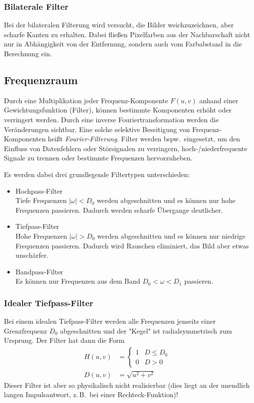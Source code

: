 \documentclass[a4paper, 11pt, accentcolor = tud3b]{tudreport}
\newcommand{\bspw}{bspw.~}
\newcommand{\zB}{z.\,B.~}
\begin{document}
				\subsubsection{Bilaterale Filter}
					Bei der bilateralen Filterung wird versucht, die Bilder weichzuzeichnen, aber scharfe Kanten zu erhalten. Dabei fließen Pixelfarben aus der Nachbarschaft nicht nur in Abhängigkeit von der Entfernung, sondern auch vom Farbabstand in die Berechnung ein.

			\subsection{Frequenzraum}
				Durch eine Multiplikation jeder Frequenz-Komponente \( F(u, v) \) anhand einer Gewichtungsfunktion (Filter), können bestimmte Komponenten erhöht oder verringert werden. Durch eine inverse Fouriertransformation werden die Veränderungen sichtbar. Eine solche selektive Beseitigung von Frequenz-Komponenten heißt \emph{Fourier-Filterung}. Filter werden \bspw eingesetzt, um den Einfluss von Datenfehlern oder Störsignalen zu verringern, hoch-/niederfrequente Signale zu trennen oder bestimmte Frequenzen hervorzuheben.
				
				Es werden dabei drei grundlegende Filtertypen unterschieden:
				\begin{itemize}
					\item Hochpass-Filter \\ Tiefe Frequenzen \( \lvert \omega \rvert < D_0 \) werden abgeschnitten und es können nur hohe Frequenzen passieren. Dadurch werden scharfe Übergange deutlicher.
					\item Tiefpass-Filter \\ Hohe Frequenzen \( \lvert \omega \rvert > D_0 \) werden abgeschnitten und es können nur niedrige Frequenzen passieren. Dadurch wird Rauschen eliminiert, das Bild aber etwas unschärfer.
					\item Bandpass-Filter \\ Es können nur Frequenzen aus dem Band \( D_0 < \omega < D_1 \) passieren.
				\end{itemize}

				\subsubsection{Idealer Tiefpass-Filter}
					Bei einem idealen Tiefpass-Filter werden alle Frequenzen jenseits einer Grenzfrequenz \( D_0 \) abgeschnitten und der "Kegel" ist radialsymmetrisch zum Ursprung. Der Filter hat dann die Form
					\begin{align*}
						H(u, v) &=
							\begin{cases}
								1 & D \leq D_0 \\
								0 & D > 0
							\end{cases} \\
						D(u, v) &= \sqrt{u^2 + v^2}
					\end{align*}
					Dieser Filter ist aber so physikalisch nicht realisierbar (dies liegt an der unendlich langen Impulsantwort, \zB bei einer Rechteck-Funktion)!
\end{document}
